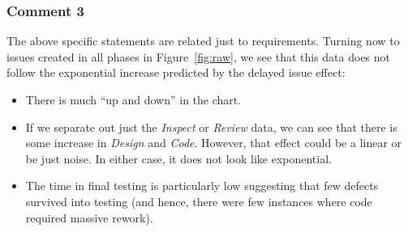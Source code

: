 \documentclass{sig-alternate}
\newcommand{\bi}{\begin{itemize}}%
\newcommand{\ei}{\end{itemize}}
\newcommand{\fig}[1]{Figure~\ref{fig:#1}}
\begin{document}
 \subsubsection{Comment 3}
 The above specific statements are related just to requirements. Turning now
 to issues created in all phases in Figure~\ref{fig:raw},  we see that
 this data does not follow the exponential increase predicted
by the delayed issue effect:
\bi
\item There is much ``up and down'' in the chart. 
\item If we separate out just the {\em Inspect} or {\em Review} data, we can see that there is some increase in {\em Design} and {\em Code}. However, that effect could be a linear or be just noise. In either case,
it does not look like exponential.
\item The time in final testing is particularly low suggesting that few defects survived into testing
(and hence, there were few instances where code required massive rework).
\ei
 


 
 
\end{document}
